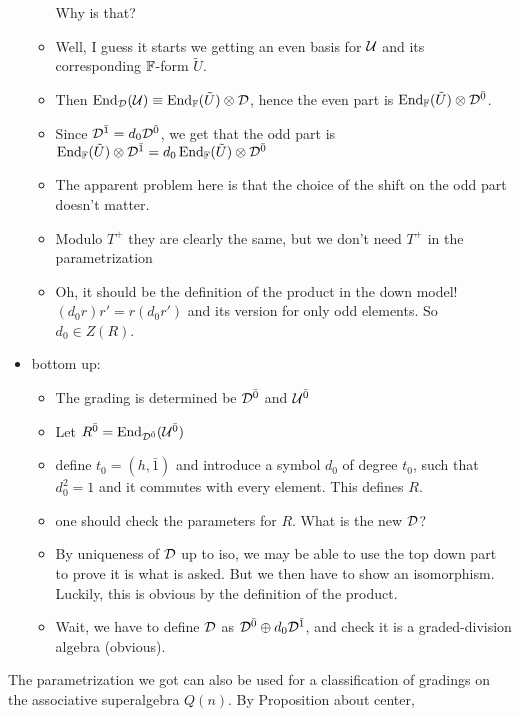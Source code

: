 \begin{itemize}
\begin{itemize}
        Why is that?
        \item Well, I guess it starts we getting an even basis for $\mathcal U$ and its corresponding $\mathbb{F}$-form $\widetilde U$. 
        \item Then $\operatorname{End}_{\mathcal{D}} (\mathcal U) \equiv \operatorname{End}_{\mathbb{F}} (\tilde U) \otimes \mathcal{D}$, hence the even part is $\operatorname{End}_{\mathbb{F}} (\tilde U) \otimes \mathcal{D}^{\bar0}$. 
        \item Since $\mathcal{D}^{\bar1} = d_0 \mathcal{D}^{\bar0}$, we get that the odd part is $\operatorname{End}_{\mathbb{F}} (\tilde U) \otimes \mathcal{D}^{\bar1} = d_0 \operatorname{End}_{\mathbb{F}} (\tilde U) \otimes \mathcal{D}^{\bar0}$
        \item The apparent problem here is that the choice of the shift on the odd part doesn't matter.
        \item Modulo $T^+$ they are clearly the same, but we don't need $T^+$ in the parametrization
        \item Oh, it should be the definition of the product in the down model! $(d_0 r) r' = r (d_0 r')$ and its version for only odd elements. So $d_0 \in Z(R)$.
    \end{itemize}
    \item bottom up:
    \begin{itemize}
        \item The grading is determined be $\mathcal{D}^{\bar0}$ and $\mathcal U^{\bar0}$
        \item Let $R^{\bar0} = \operatorname{End}_{\mathcal{D}^{\bar0}} (\mathcal U^{\bar0})$ 
        \item define $t_0 = (h, \bar 1)$ and introduce a symbol $d_0$ of degree $t_0$, such that $d_0^2 = 1$ and it commutes with every element. This defines $R$.
        \item one should check the parameters for $R$. What is the new $\mathcal{D}$?
        \item By uniqueness of $\mathcal{D}$ up to iso, we may be able to use the top down part to prove it is what is asked. But we then have to show an isomorphism. Luckily, this is obvious by the definition of the product. 
        \item Wait, we have to define $\mathcal{D}$ as $\mathcal{D}^{\bar0} \oplus d_0\mathcal{D}^{\bar1}$, and check it is a graded-division algebra (obvious).
    \end{itemize}
\end{itemize}

The parametrization we got can also be used for a classification of gradings on the associative superalgebra $Q(n)$. 
By Proposition about center, 